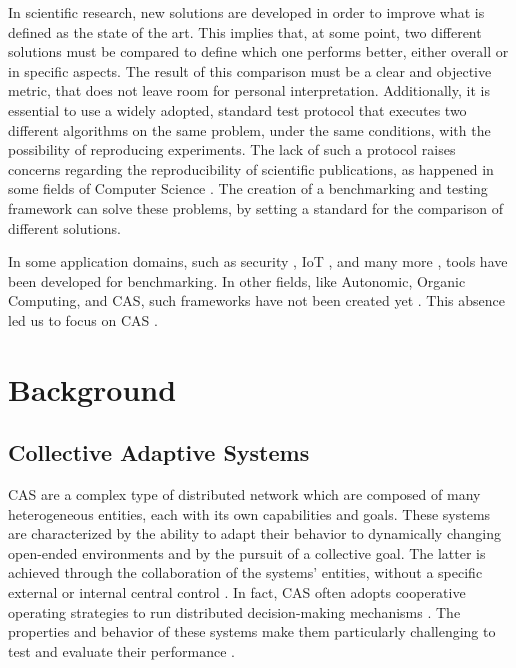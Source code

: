 \documentclass[12pt,a4paper,openright,twoside]{book}
\begin{document}
In scientific research, new solutions are developed in order to improve what is defined as the state of the art. 
This implies that, at some point, two different solutions must be compared to define which one performs better, either overall or in specific aspects.
The result of this comparison must be a clear and objective metric, that does not leave room for personal interpretation.
Additionally, it is essential to use a widely adopted, standard test protocol that executes two different algorithms on the same problem, under the same conditions, with the possibility of reproducing experiments. 
The lack of such a protocol raises concerns regarding the reproducibility of scientific publications, as happened in some fields of Computer Science \cite{DBLP:journals/cacm/CollbergP16, DBLP:conf/aaai/GundersenK18}.
The creation of a benchmarking and testing framework can solve these problems, by setting a standard for the comparison of different solutions.

In some application domains, such as security \cite{DBLP:conf/bdet/Es-SamaaliOBMK21}, IoT \cite{DBLP:conf/IEEEares/RuckGWLN23}, and many more \cite{DBLP:journals/ral/CollinsRYSJP24, DBLP:journals/corr/abs-2401-01275}, tools have been developed for benchmarking. 
In other fields, like Autonomic, Organic Computing, and \ac*{CAS}, such frameworks have not been created yet \cite{DBLP:conf/icac/BrownHHLLSY04, DBLP:conf/autonomics/EtcheversCV09}.
This absence led us to focus on \ac*{CAS} \cite{DBLP:journals/sttt/NicolaJW20}.

\section{Background}

\subsection{Collective Adaptive Systems}

\ac{CAS} are a complex type of distributed network which are composed of many heterogeneous entities, each with its own capabilities and goals. 
These systems are characterized by the ability to adapt their behavior to dynamically changing open-ended environments \cite{DBLP:conf/birthday/BucchiaroneM19} and by the pursuit of a collective goal. 
The latter is achieved through the collaboration of the systems’ entities, without a specific external or internal central control \cite{DBLP:series/lncs/HolzlRW08, DBLP:journals/corr/abs-1108-5643}. 
In fact, CAS often adopts cooperative operating strategies to run distributed decision-making mechanisms \cite{DBLP:journals/tomacs/Aldini18}.
The properties and behavior of these systems make them particularly challenging to test and evaluate their performance \cite{DBLP:conf/srds/AlmeidaMV10}.
\end{document}
